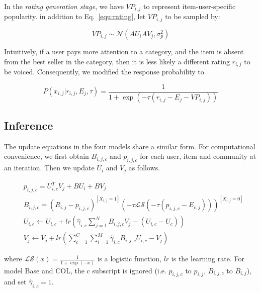 \documentclass[sigconf]{acmart}
\newenvironment{shrinkeq}[1]
{ \bgroup
  \addtolength\abovedisplayshortskip{#1}
  \addtolength\abovedisplayskip{#1}
  \addtolength\belowdisplayshortskip{#1}
  \addtolength\belowdisplayskip{#1}}
{\egroup\ignorespacesafterend}
\begin{document}
In the \textit{rating generation stage}, we have $VP_{i,j}$ to represent item-user-specific popularity. in addition to Eq.~\ref{equ:rating}, let $VP_{i,j}$ to be sampled by:

\begin{equation}\label{equ:popularity}
VP_{i,j}\sim \mathcal{N}(AU_i AV_j,\sigma_p^2) 
\end{equation} 

Intuitively, if a user pays more attention to a category, and the item is absent from the best seller in the category, then it is less likely a different rating $r_{i,j}$ to be voiced.  Consequently, we modified the response probability to

\begin{equation}\label{equ:responseCPV}
P(x_{i,j}|r_{i,j},E_{j},\tau)=\frac{1}{1+\exp{(-\tau(r_{i,j}-E_{j}-VP_{i,j}))}}
\end{equation}



\subsection{Inference}

The update equations in the four models share a similar form. For computational convenience, we first obtain $B_{i,j,c}$ and $p_{i,j,c}$ for each user, item and community at an iteration. Then we update $U_i$ and $V_j$ as follows.

\begin{shrinkeq}{-2ex}
\begin{equation}\label{equ:update}
\begin{split}
&p_{i,j,c}=U_{i,c}^{T}V_{j} + BU_{i} + BV_{j} \\
&B_{i,j,c}=(R_{i,j}-p_{i,j,c})^{[X_{i,j}=1]}(-\tau \mathcal{LS}(-\tau(p_{i,j,c}-E_{c,j})))^{[X_{i,j}=0]} \\
&U_{i,c}\leftarrow U_{i,c}+lr(\hat{\gamma}_{i,c}\sum\limits_{j=1}^{N}B_{i,j,c}V_j-(U_{i,c}-U_c)) \\
&V_j\leftarrow V_j+lr(\sum\limits_{c=1}^{C}\sum\limits_{i=1}^{M}\hat{\gamma}_{i,c}B_{i,j,c}U_{i,c}-V_j) 
\end{split}
\end{equation}
\end{shrinkeq}

where $\mathcal{LS}(x)=\frac{1}{1+\exp(-x)}$ is a logistic function, $lr$ is the learning rate. For model Base and COL, the c subscript is ignored (i.e. $p_{i,j,c}$ to $p_{i,j}$, $B_{i,j,c}$ to $B_{i,j}$), and set $\hat{\gamma}_{i,c}=1$. 
\end{document}
